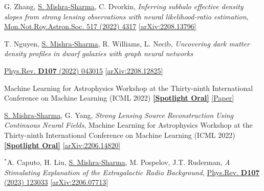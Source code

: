 \documentclass[letterpaper,11pt]{article}
\newenvironment{packed_itemize}{
\begin{itemize}[label=\raisebox{0.25ex}{\tiny$\bullet$}]
  \setlength{\itemsep}{4.2pt}
  \setlength{\parskip}{0pt}
  \setlength{\parsep}{0pt}}{\end{itemize}
}
\newenvironment{packed_enumerate}[1][]{
\begin{etaremune}[#1]
  \setlength{\itemsep}{3.7pt}
  \setlength{\parskip}{0pt}
  \setlength{\parsep}{0pt}}{\end{etaremune}
}
\begin{document}
\begin{packed_enumerate}[start=37]
  \item G. Zhang, \underline{S. Mishra-Sharma}, C. Dvorkin, \emph{Inferring subhalo effective density slopes from strong lensing observations with neural likelihood-ratio estimation}, \href{https://doi.org/10.1093/mnras/stac3014}{Mon.Not.Roy.Astron.Soc. 517 (2022) 4317} \href{https://arxiv.org/abs/2208.13796}{[arXiv:2208.13796]}

  \item T. Nguyen, \underline{S. Mishra-Sharma}, R. Williams, L. Necib, \emph{Uncovering dark matter density profiles in dwarf galaxies with graph neural networks}
  \begin{packed_itemize}
      \item {\href{https://journals.aps.org/prd/abstract/10.1103/PhysRevD.107.043015}{Phys.Rev. \textbf{D107} (2022) 043015}} \href{https://arxiv.org/abs/2208.12825}{[arXiv:2208.12825]}
      \item Machine Learning for Astrophysics Workshop at the Thirty-ninth International Conference on Machine Learning (ICML 2022) \href{https://ml4astro.github.io/icml2022/}{\textbf{[Spotlight Oral]}} \href{https://ml4astro.github.io/icml2022/assets/38.pdf}{[Paper]}
    \end{packed_itemize}
    
  \item \underline{S. Mishra-Sharma}, G. Yang, \emph{Strong Lensing Source Reconstruction Using Continuous Neural Fields}, {Machine Learning for Astrophysics Workshop at the Thirty-ninth International Conference on Machine Learning (ICML 2022)} \href{https://ml4astro.github.io/icml2022/}{\textbf{[Spotlight Oral]}} \href{https://arxiv.org/abs/2206.14820}{[arXiv:2206.14820]}
   

  \item $^*$A. Caputo, H. Liu, \underline{S. Mishra-Sharma}, M. Pospelov, J.T. Ruderman, \emph{A Stimulating Explanation of the Extragalactic Radio Background}, \href{https://journals.aps.org/prd/abstract/10.1103/PhysRevD.107.123033}{Phys.Rev. \textbf{D107} (2023) 123033} \href{https://arxiv.org/abs/2206.07713}{[arXiv:2206.07713]}


\end{packed_enumerate}
\end{document}

